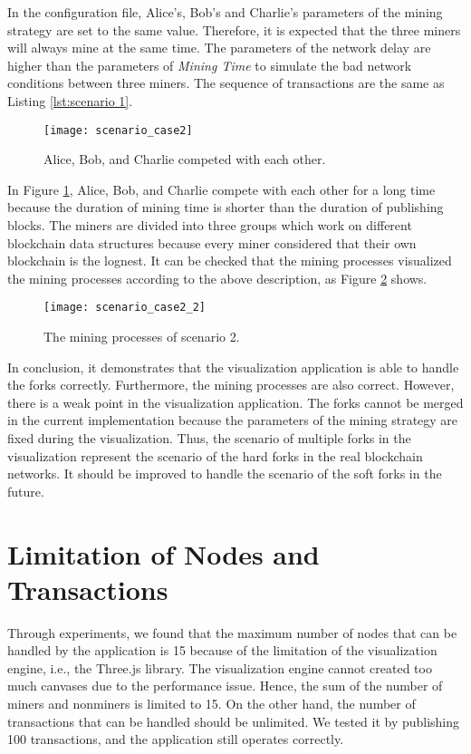 In the configuration file, Alice's, Bob's and Charlie's parameters of the mining strategy are set to the same value. Therefore, it is expected that the three miners will always mine at the same time. The parameters of the network delay are higher than the parameters of \textit{Mining Time} to simulate the bad network conditions between three miners. The sequence of transactions are the same as Listing \ref{lst:scenario 1}.

\begin{figure}[htb]
    \centering
    \texttt{[image: scenario\_case2]}
    \caption{Alice, Bob, and Charlie competed with each other.}
    \label{fig:alice, bob, and charlie competed with each other}
\end{figure}

In Figure \ref{fig:alice, bob, and charlie competed with each other}, Alice, Bob, and Charlie compete with each other for a long time because the duration of mining time is shorter than the duration of publishing blocks. The miners are divided into three groups which work on different blockchain data structures because every miner considered that their own blockchain is the lognest. It can be checked that the mining processes visualized the mining processes according to the above description, as Figure \ref{fig:the mining processes of scenario 2} shows.

\begin{figure}[htb]
    \centering
    \texttt{[image: scenario\_case2\_2]}
    \caption{The mining processes of scenario 2.}
    \label{fig:the mining processes of scenario 2}
\end{figure}

In conclusion, it demonstrates that the visualization application is able to handle the forks correctly. Furthermore, the mining processes are also correct. However, there is a weak point in the visualization application. The forks cannot be merged in the current implementation because the parameters of the mining strategy are fixed during the visualization. Thus, the scenario of multiple forks in the visualization represent the scenario of the hard forks in the real blockchain networks. It should be improved to handle the scenario of the soft forks in the future.

\section{Limitation of Nodes and Transactions}

Through experiments, we found that the maximum number of nodes that can be handled by the application is 15 because of the limitation of the visualization engine, i.e., the Three.js library. The visualization engine cannot created too much canvases due to the performance issue. Hence, the sum of the number of miners and nonminers is limited to 15. On the other hand, the number of transactions that can be handled should be unlimited. We tested it by publishing 100 transactions, and the application still operates correctly.


